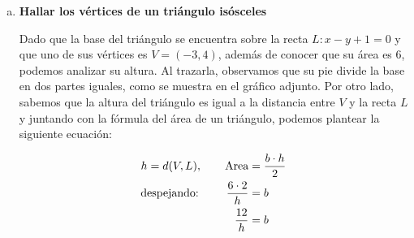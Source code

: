 \documentclass[11pt]{article}
\begin{document}
\begin{enumerate}[\hspace{-5mm} 1) ]
\begin{enumerate}[(a) ]
\begin{tcolorbox}[colback=white,colframe=red!60!black,title= \textbf{Observación:}]

Para calcular el área de un triángulo dados tres vértices $
A(x_1, y_1), \quad B(x_2, y_2), \quad C(x_3, y_3)$:
\begin{enumerate}
    \item Elegir un lado (por ejemplo \( AC \)) como base.
    \item Calcular su longitud con la fórmula de distancia:
    \[
    \text{base} = \sqrt{(x_3 - x_1)^2 + (y_3 - y_1)^2}.
    \]
    \item Obtener la ecuación de la recta que contiene esa base, es decir considerar $L$ la recta que pasa por los puntos $A$ y $C$. 
    \item Calcular la distancia perpendicular desde el vértice opuesto (por ejemplo \( B \)) a dicha recta:
    \[
    d = \frac{|ax_0 + by_0 + c|}{\sqrt{a^2 + b^2}},
    \]
    donde \( ax + by + c = 0 \) es la ecuación de la recta que pasa por los puntos $A$ y $C$. 
    \item El área se obtiene como:
    \[
    S = \frac{1}{2} \times \text{base} \times \text{altura}.
    \]
\end{enumerate}

\end{tcolorbox}


\item \textbf{ Hallar los vértices de un triángulo isósceles} \\
 



\begin{minipage}{.53\textwidth} 



Dado que la base del triángulo se encuentra sobre la recta \( L: x - y + 1 = 0 \) y que uno de sus vértices es \( V = (-3,4) \), además de conocer que su área es 6, podemos analizar su altura. Al trazarla, observamos que su pie divide la base en dos partes iguales, como se muestra en el gráfico adjunto. Por otro lado, sabemos que la altura del triángulo es igual a la distancia entre \( V \) y la recta \( L \) y juntando con la fórmula del área de un triángulo, podemos plantear la siguiente ecuación:

\begin{align*}
h= d(V,L) , \qquad \text{Area} &= \frac{b\cdot h}{2}
    \\
\text{despejando: \qquad }    \frac{6\cdot 2}{h} &=  b
\\
\frac{12}{h} &=  b
\end{align*}






\end{minipage}
\end{enumerate}
\end{enumerate}
\end{document}
